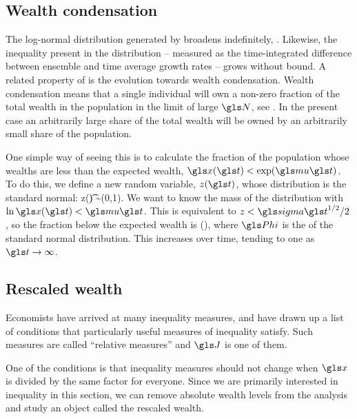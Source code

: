 
\subsection{Wealth condensation}
The log-normal distribution generated by \GBM broadens indefinitely, . Likewise, the inequality present in the distribution -- measured as the time-integrated difference between ensemble and time average growth rates -- grows without bound. A related property of \GBM is the evolution towards wealth condensation. Wealth condensation means that a single individual will own a non-zero fraction of the total wealth in the population in the limit of large $\N$, see \eg \cite{BouchaudMezard2000}. In the present case an arbitrarily large share of the  total wealth will be owned by an arbitrarily small share of the population.

One simple way of seeing this is to calculate the fraction of the population whose wealths are less than the expected wealth, \ie $\x(\t)<\exp(\gmu \t)$. To do this, we define a new random variable, $z(\t)$, whose distribution is the standard normal:
\be
z(\t) \equiv {} \sim \mathcal{\N}(0,1).
\ee
We want to know the mass of the distribution with $\ln \x(\t)<\gmu \t$. This is equivalent to $z<\gsigma \t^{1/2}/2$, so the fraction below the expected wealth is
\be
\gPhi\left(\right),
\ee
where $\gPhi$ is the \CDF of the standard normal distribution. This increases over time, tending to one as $\t\to\infty$.


\subsection{Rescaled wealth}
Economists have arrived at many inequality measures, and have drawn up a list of conditions that particularly useful measures of inequality satisfy. Such measures are called ``relative measures'' \cite[Appendix 4]{Sen1997} and $\J$ is one of them.

One of the conditions is that inequality measures should not change when $\x$ is divided by the same factor for everyone. Since we are primarily interested in inequality in this section, we can remove absolute wealth levels from the analysis and study an object called the rescaled wealth.

